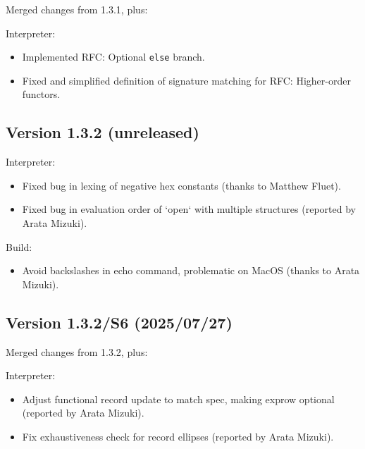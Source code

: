 \documentclass[twoside,titlepage]{article}
\begin{document}
\begin{appendix}
Merged changes from 1.3.1, plus:

Interpreter:
\begin{itemize} \setlength{\itemsep}{0em}
\item Implemented RFC: Optional {\tt else} branch.
\item Fixed and simplified definition of signature matching for RFC: Higher-order functors.
\end{itemize}

\subsection*{Version 1.3.2 (unreleased)}

Interpreter:
\begin{itemize} \setlength{\itemsep}{0em}
\item Fixed bug in lexing of negative hex constants (thanks to Matthew Fluet).
\item Fixed bug in evaluation order of `open` with multiple structures (reported by Arata Mizuki).
\end{itemize}

Build:
\begin{itemize} \setlength{\itemsep}{0em}
\item Avoid backslashes in echo command, problematic on MacOS (thanks to Arata Mizuki).
\end{itemize}

\subsection*{Version 1.3.2/S6 (2025/07/27)}

Merged changes from 1.3.2, plus:

Interpreter:
\begin{itemize} \setlength{\itemsep}{0em}
\item Adjust functional record update to match spec, making exprow optional (reported by Arata Mizuki).
\item Fix exhaustiveness check for record ellipses (reported by Arata Mizuki).
\end{itemize}


\vfill
\pagebreak
\begin{thebibliography}{MTHM97}


\end{thebibliography}
\end{appendix}
\end{document}
